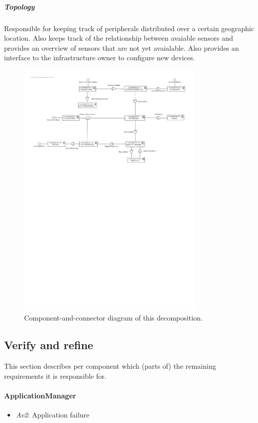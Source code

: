 \documentclass[english]{sareport}
\begin{document}
\subparagraph{Topology}
Responsible for keeping track of peripherals distributed over a certain geographic location. Also keeps track of the relationship between avaiable sensors and provides an overview of sensors that are not yet avaialable. Also provides an interface to the infrastructure owner to configure new devices.
\begin{figure}[!htp]
	\centering
	\includegraphics[width=0.8\textwidth]{component_diagram_1.pdf}
	\caption{Component-and-connector diagram of this decomposition.
	}\label{fig:it1-cc_main}
\end{figure}

\subsection{Verify and refine}
This section describes per component which (parts of) the remaining
requirements it is responsible for.

\paragraph{ApplicationManager}
\begin{itemize}
	\item \emph{Av2}: Application failure
\end{itemize}
\end{document}
